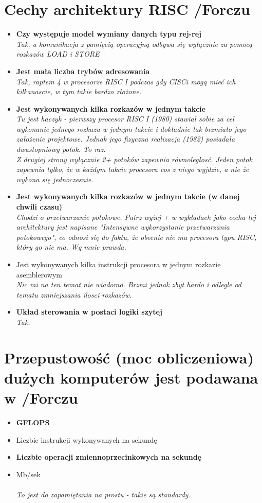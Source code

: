 \documentclass[a4paper,twoside]{article}
\begin{document}
\section{Cechy architektury RISC {\small /Forczu}}
	\begin{itemize}
    \item \textbf{Czy występuje model wymiany danych typu rej-rej}\\
    {\small \emph{Tak, a komunikacja z pamięcią operacyjną odbywa się wyłącznie za pomocą rozkazów LOAD i STORE}}
    \item \textbf{Jest mała liczba trybów adresowania}\\
    {\small \emph{Tak, raptem 4 w procesorze RISC I podczas gdy CISCi mogą mieć ich kilkanascie, w tym takie bardzo złożone.}}
    \item \textbf{Jest wykonywanych kilka rozkazów w jednym takcie}\\
    {\small \emph{Tu jest haczyk - pierwszy procesor RISC I (1980) stawiał sobie za cel wykonanie \emph{jednego rozkazu w jednym takcie} i dokładnie tak brzmiało jego założenie projektowe. Jednak jego fizyczna realizacja (1982) posiadała dwustopniowy potok. To raz.\\
    Z drugiej strony wyłącznie 2+ potoków zapewnia równoległosć. Jeden potok zapewnia tylko, że w każdym takcie procesora cos z niego wyjdzie, a nie że wykona się jednoczesnie.}}
    \item \textbf{Jest wykonywanych kilka rozkazów w jednym takcie (w danej chwili czasu)}\\
    {\small \emph{Chodzi o przetwarzanie potokowe. Patrz wyżej + w wykładach jako cecha tej architektury jest napisane "Intensywne wykorzystanie przetwarzania potokowego", co odnosi się do faktu, że obecnie nie ma procesora typu RISC, który go nie ma. Wg mnie prawda.}}
    \item Jest wykonywanych kilka instrukcji procesora w jednym rozkazie asemblerowym\\
    {\small \emph{Nic mi na ten temat nie wiadomo. Brzmi jednak zbyt hardo i odlegle od tematu zmniejszania ilosci rozkazów.}}
    \item \textbf{Układ sterowania w postaci logiki szytej}\\
    {\small \emph{Tak.}}
    \end{itemize}

\section{Przepustowość (moc obliczeniowa) dużych komputerów jest podawana w {\small /Forczu}}
	\begin{itemize}
    \item \textbf{GFLOPS}
    \item Liczbie instrukcji wykonywanych na sekundę
    \item \textbf{Liczbie operacji zmiennoprzecinkowych na sekundę}
    \item Mb/sek\\\\
    {\small \emph{To jest do zapamiętania na prostu - takie są standardy}}.
    \end{itemize}
\end{document}
